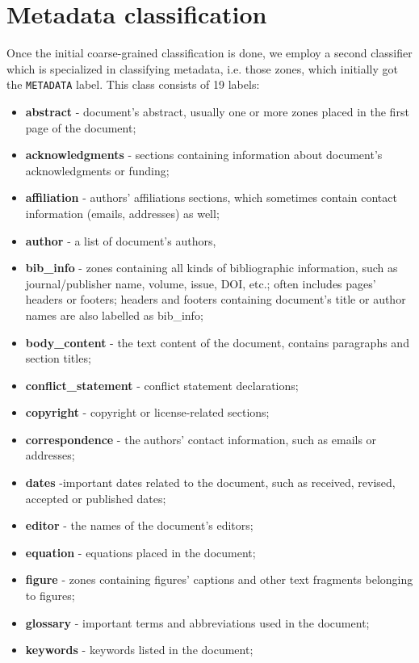 \section{Metadata classification}
Once the initial coarse-grained classification is done, we employ a second classifier which is specialized in classifying metadata, i.e. those zones, which initially got the \verb+METADATA+ label. This class consists of 19 labels:
\begin{itemize}
    \item \textbf{abstract} - document's abstract, usually one or more zones placed in the first page of the document;
    \item \textbf{acknowledgments} - sections containing information about document's acknowledgments or funding;
    \item \textbf{affiliation} - authors' affiliations sections, which sometimes contain contact information (emails, addresses) as well;
    \item \textbf{author} - a list of document's authors,
    \item \textbf{bib\_info} - zones containing all kinds of bibliographic information, such as journal/publisher name, volume, issue, DOI, etc.; often includes pages' headers or footers; headers and footers containing document's title or author names are also labelled as bib\_info;
    \item \textbf{body\_content} - the text content of the document, contains paragraphs and section titles;
    \item \textbf{conflict\_statement} - conflict statement declarations;
    \item \textbf{copyright} - copyright or license-related sections;
    \item \textbf{correspondence} - the authors' contact information, such as emails or addresses;
    \item \textbf{dates} -important dates related to the document, such as received, revised, accepted or published dates;
    \item \textbf{editor} - the names of the document's editors;
    \item \textbf{equation} - equations placed in the document;
    \item \textbf{figure} - zones containing figures' captions and other text fragments belonging to figures;
    \item \textbf{glossary} - important terms and abbreviations used in the document;
    \item \textbf{keywords} - keywords listed in the document;

\end{itemize}
